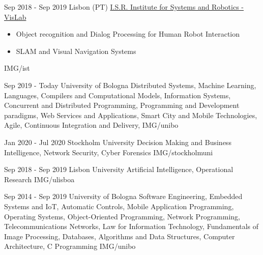 \documentclass[paper=a4,fontsize=11pt, hidelinks]{temp} %
\begin{document}
{Sep 2018 - Sep 2019 }
{Lisbon (PT) \href{https://welcome.isr.tecnico.ulisboa.pt/}{ I.S.R. Institute for Systems and Robotics - VisLab}}
{
 \begin{itemize}
    \item Object recognition and Dialog Processing for Human Robot Interaction
    \item SLAM and Visual Navigation Systems
 \end{itemize}
} {IMG/ist}

\noindent

{Sep 2019 - Today}
{University of Bologna}
{Distributed Systems, Machine Learning,    Languages, Compilers and Computational Models,    Information Systems,     Concurrent and Distributed Programming,    Programming and Development paradigms,    Web Services and Applications,     Smart City and Mobile Technologies,     Agile, Continuous Integration and Delivery,  } 
{IMG/unibo}


\sepspace

{Jan 2020 - Jul 2020}
{Stockholm University}
{Decision Making and Business Intelligence, Network Security, Cyber Forensics}
{IMG/stockholmuni}

\sepspace

{Sep 2018 - Sep 2019}
{Lisbon University}
{Artificial Intelligence, Operational Research} 
{IMG/ulisboa}

\sepspace

{Sep 2014 - Sep 2019}
{University of Bologna }
{Software Engineering, Embedded Systems and IoT, Automatic Controls, Mobile Application Programming, Operating Systems, Object-Oriented Programming, Network Programming, Telecommunications Networks, Law for Information Technology, Fundamentals of Image Processing, Databases, Algorithms and Data Structures, Computer Architecture, C Programming} 
{IMG/unibo}
\end{document}
